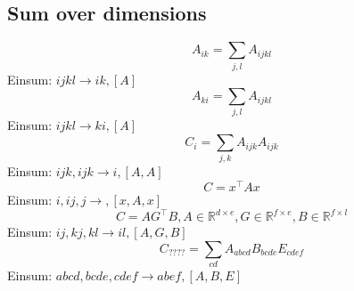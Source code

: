 \documentclass[9pt]{article}
\begin{document}
\subsection*{Sum over dimensions}
\begin{equation*}
	A_{ik} = \sum_{j,l} A_{ijkl}
\end{equation*}
Einsum: $ijkl\rightarrow ik, [A]$
\begin{equation*}
	A_{ki} = \sum_{j,l} A_{ijkl}
\end{equation*}
Einsum: $ijkl\rightarrow ki, [A]$
\begin{equation*}
	C_{i} = \sum_{j,k} A_{ijk}A_{ijk}
\end{equation*}
Einsum: $ijk,ijk\rightarrow i, [A,A]$
\begin{equation*}
	C=x^{\top}Ax
\end{equation*}
Einsum: $i,ij,j\rightarrow, [x,A,x]$
\begin{equation*}
	C=AG^{\top}B, A\in \mathbb{R}^{d\times e}, G \in \mathbb{R}^{f\times e}, B\in \mathbb{R}^{f\times l}
\end{equation*}
Einsum: $ij,kj,kl\rightarrow il, [A, G,B]$
\begin{equation*}
	C_{????} = \sum_{cd} A_{abcd}B_{bcde}E_{cdef}
\end{equation*}
Einsum: $abcd,bcde,cdef\rightarrow abef, [A,B,E]$
\end{document}

